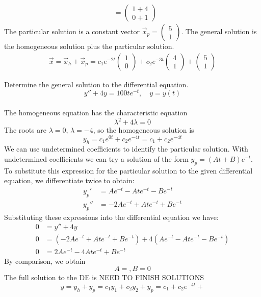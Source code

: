 {\begin{align}
    & =  \begin{pmatrix} 1 + 4 \\ 0 + 1\end{pmatrix} 
\end{align}
The particular solution is a constant vector $\displaystyle \vec x_p =  \begin{pmatrix} 5 \\ 1 \end{pmatrix}$. The general solution is the homogeneous solution plus the particular solution. 
\begin{align}
    \vec x = \vec x_h + \vec x_p = c_1e^{-2t}\begin{pmatrix}1\\0\end{pmatrix} + c_2e^{-3t}\begin{pmatrix}4\\1\end{pmatrix} + \begin{pmatrix} 5\\1\end{pmatrix}
\end{align}

    } 
   \else
   \fi

\fi 








\ifnum {}
\question[5] Determine the general solution to the differential equation. 
$$y'' + 4y = 100te^{-t}, \quad y=y(t)$$
\ifnum {} {\color{DarkBlue} \\[12pt] 
The homogeneous equation has the characteristic equation
$$\lambda ^2+4\lambda = 0$$
The roots are $\lambda= 0$, $\lambda = -4$, so the homogeneous solution is
$$y_h = c_1 e^{0t} + c_2 e^{-4t} = c_1 + c_2 e^{-4t}$$
We can use undetermined coefficients to identify the particular solution. With undetermined coefficients we can try a solution of the form $y_p = (At+B)e^{-t}$. To substitute this expression for the particular solution to the given differential equation, we differentiate twice to obtain:
\begin{align}
    y_p ' &= Ae^{-t} - Ate^{-t} - Be^{-t} \\
    y_p'' &= -2Ae^{-t} +Ate^{-t} + Be^{-t}
\end{align}
Substituting these expressions into the differential equation we have:
\begin{align}
    0 &= y'' + 4y \\
    0 &= (-2Ae^{-t} +Ate^{-t} +    Be^{-t}) +4 (Ae^{-t} - Ate^{-t} - Be^{-t}) \\ 
    0 &= 2Ae^{-t} - 4Ate^{-t} + Be^{-t}
\end{align}
By comparison, we obtain
$$ A = , B = 0$$
The full solution to the DE is NEED TO FINISH SOLUTIONS
$$y = y_h + y_p = c_1y_1  + c_2y_2 + y_p = c_1 + c_2 e^{-4t} + $$
} 
\else 
\vspace{3cm}
\fi
\fi 




